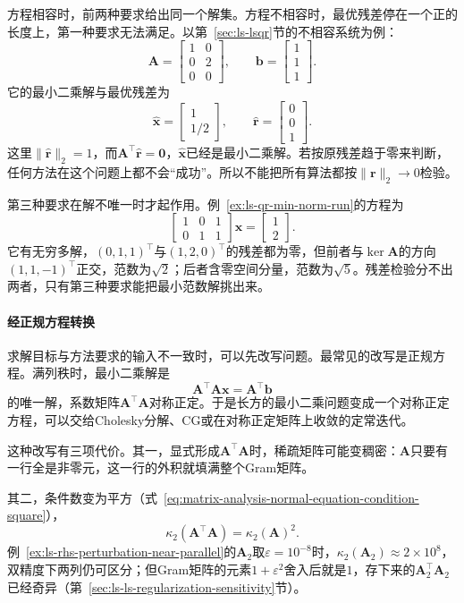 方程相容时，前两种要求给出同一个解集。方程不相容时，最优残差停在一个正的长度上，第一种要求无法满足。以第~\ref{sec:ls-lsqr}节的不相容系统为例：
\[
 \bm A=\begin{bmatrix}1&0\\0&2\\0&0\end{bmatrix},\qquad
 \bm b=\begin{bmatrix}1\\1\\1\end{bmatrix}.
\]
它的最小二乘解与最优残差为
\[
 \hat{\bm x}=\begin{bmatrix}1\\1/2\end{bmatrix},\qquad
 \hat{\bm r}=\begin{bmatrix}0\\0\\1\end{bmatrix}.
\]
这里$\lVert\hat{\bm r}\rVert_2=1$，而$\bm A^\top\hat{\bm r}=\bm0$，$\hat{\bm x}$已经是最小二乘解。若按原残差趋于零来判断，任何方法在这个问题上都不会“成功”。所以不能把所有算法都按$\lVert\bm r\rVert_2\to0$检验。

第三种要求在解不唯一时才起作用。例~\ref{ex:ls-qr-min-norm-run}的方程为
\[
 \begin{bmatrix}1&0&1\\0&1&1\end{bmatrix}\bm x=\begin{bmatrix}1\\2\end{bmatrix}.
\]
它有无穷多解，$(0,1,1)^\top$与$(1,2,0)^\top$的残差都为零，但前者与$\ker\bm A$的方向$(1,1,-1)^\top$正交，范数为$\sqrt2$；后者含零空间分量，范数为$\sqrt5$。残差检验分不出两者，只有第三种要求能把最小范数解挑出来。

\paragraph{经正规方程转换}
求解目标与方法要求的输入不一致时，可以先改写问题。最常见的改写是正规方程。满列秩时，最小二乘解是
\[
 \bm A^\top\bm A\bm x=\bm A^\top\bm b
\]
的唯一解，系数矩阵$\bm A^\top\bm A$对称正定。于是长方的最小二乘问题变成一个对称正定方程，可以交给Cholesky分解、CG或在对称正定矩阵上收敛的定常迭代。

这种改写有三项代价。其一，显式形成$\bm A^\top\bm A$时，稀疏矩阵可能变稠密：$\bm A$只要有一行全是非零元，这一行的外积就填满整个Gram矩阵。

其二，条件数变为平方（式~\eqref{eq:matrix-analysis-normal-equation-condition-square}），
\[
 \kappa_2(\bm A^\top\bm A)=\kappa_2(\bm A)^2 .
\]
例~\ref{ex:ls-rhs-perturbation-near-parallel}的$\bm A_2$取$\varepsilon=10^{-8}$时，$\kappa_2(\bm A_2)\approx2\times10^8$，双精度下两列仍可区分；但Gram矩阵的元素$1+\varepsilon^2$舍入后就是$1$，存下来的$\bm A_2^\top\bm A_2$已经奇异（第~\ref{sec:ls-ls-regularization-sensitivity}节）。

